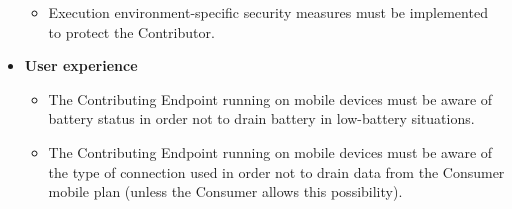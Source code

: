 \begin{itemize}
    \begin{itemize}
        \item Execution environment-specific security measures must be implemented to protect the Contributor.
    \end{itemize}
    \item \textbf{User experience}
    \begin{itemize}
        \item The Contributing Endpoint running on mobile devices must be aware of battery status in order not to drain battery in low-battery situations.
        \item The Contributing Endpoint running on mobile devices must be aware of the type of connection used in order not to drain data from the Consumer mobile plan (unless the Consumer allows this possibility).
    \end{itemize}
\end{itemize}
